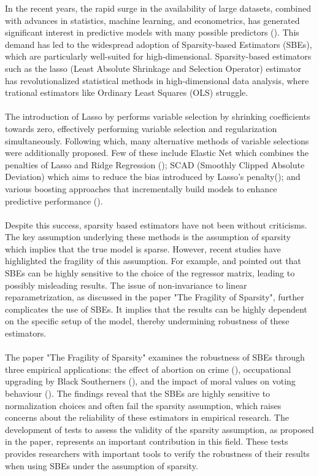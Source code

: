 In the recent years, the rapid surge in the availability of large datasets,  combined with advances in statistics, machine learning, and econometrics, has generated significant interest in predictive models with many possible predictors (\cite{illusitionOfSparsity}). This demand has led to the widespread adoption of Sparsity-based Estimators (SBEs), which are particularly well-suited for high-dimensional. Sparsity-based estimators such as the lasso (Least Absolute Shrinkage and Selection Operator) estimator has revolutionalized statistical methods in high-dimensional data analysis, where trational estimators like Ordinary Least Squares (OLS) struggle. \\
\\
The introduction of Lasso by \cite{lasso} performs variable selection by shrinking coefficients towards zero, effectively performing variable selection and regularization simultaneously. Following which, many alternative methods of variable selections were additionally proposed. Few of these include Elastic Net which combines the penalties of Lasso and Ridge Regression (\cite{elasticNet}); SCAD (Smoothly Clipped Absolute Deviation) which aims to reduce the bias introduced by Lasso's penalty(\cite{SCAD}); and various boosting approaches  that incrementally build models to enhance predictive performance (\cite{boostingApproaches}).\\
\\
Despite this success, sparsity based estimators have not been without criticisms. The key assumption underlying these methods is the assumption of sparsity which implies that the true model is sparse. However, recent studies have highlighted the fragility of this assumption. For example, \cite{giannone2021economic} and \cite{wuthrich2023omitted} pointed out that SBEs can be highly sensitive to the choice of the regressor matrix, leading to possibly misleading results. The issue of non-invariance to linear reparametrization, as discussed in the paper "The Fragility of Sparsity", further complicates the use of SBEs. It implies that the results can be highly dependent on the specific setup of the model, thereby undermining robustness of these estimators. \\
\\
The paper "The Fragility of Sparsity" examines the robustness of SBEs through three empirical applications: the effect of abortion on crime (\cite{abortionCrime}), occupational upgrading by Black Southerners (\cite{blackWW2}), and the impact of moral values on voting behaviour (\cite{votingMoral}). The findings reveal that the SBEs are highly sensitive to normalization choices and often fail the sparsity assumption, which raises concerns about the reliability of these estimators in empirical research. The development of tests to assess the validity of the sparsity assumption, as proposed in the paper, represents an important contribution in this field. These tests provides researchers with important tools to verify the robustness of their results when using SBEs under the assumption of sparsity.
